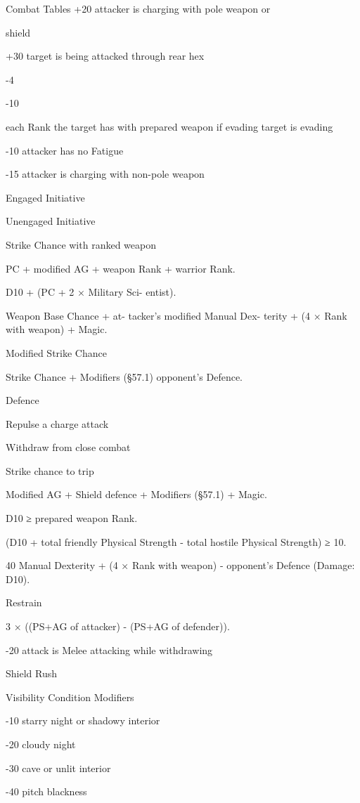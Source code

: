 \begin{Table}{Combat Tables}
+20  attacker is charging with pole weapon or 

shield 

+30  target is being attacked through rear hex 

-4 

-10 

each Rank the target has with prepared 
weapon if evading 
target is evading 

-10  attacker has no Fatigue 

-15  attacker is charging with non-pole weapon 

Engaged 
Initiative  

Unengaged 
Initiative  

Strike Chance 
with ranked 
weapon  

PC + modified AG + weapon 
Rank + warrior Rank. 

D10 + (PC + 2 × Military Sci-
entist). 

Weapon Base Chance + at-
tacker’s modified Manual Dex-
terity + (4 × Rank with weapon) 
+ Magic. 

Modified Strike 
Chance  

Strike Chance + Modifiers 
(§57.1) opponent’s Defence. 

Defence  

Repulse a 
charge attack  

Withdraw from 
close combat  

Strike chance to 
trip  

Modified AG + Shield defence 
+ Modifiers (§57.1) + Magic. 

D10 ≥ prepared weapon Rank. 

(D10 + total friendly Physical 
Strength - total hostile Physical 
Strength) ≥ 10. 

40%
Manual Dexterity + (4 × Rank 
with weapon) - opponent’s 
Defence (Damage: D10). 

Restrain  

3 × ((PS+AG of attacker) - 
(PS+AG of defender)). 

-20  attack is Melee attacking while withdrawing 

Shield Rush  

Visibility Condition Modifiers 

-10  starry night or shadowy interior 

-20  cloudy night 

-30  cave or unlit interior 

-40  pitch blackness 


\end{Table}
